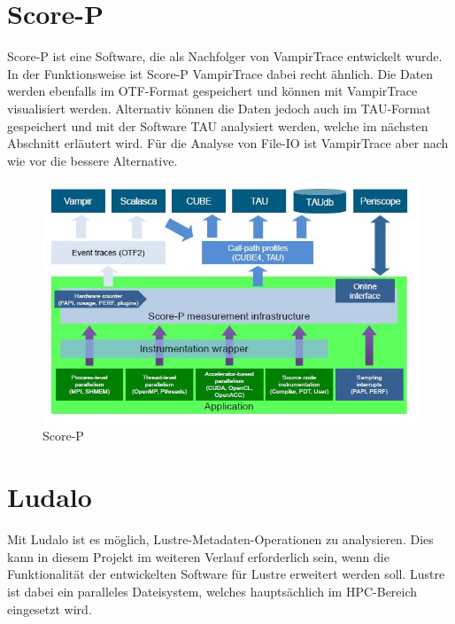\section{Score-P}
Score-P ist eine Software, die als Nachfolger von VampirTrace entwickelt wurde. In der Funktionsweise ist Score-P VampirTrace dabei recht \"ahnlich. Die Daten werden ebenfalls im OTF-Format gespeichert und k\"onnen mit VampirTrace visualisiert werden. Alternativ k\"onnen die Daten jedoch auch im TAU-Format gespeichert und mit der Software TAU analysiert werden, welche im n\"achsten Abschnitt erl\"autert wird. F\"ur die Analyse von File-IO ist VampirTrace aber nach wie vor die bessere Alternative.\cite{Kunke.2014}\cite{VirtualInstituteHighProductivitySupercomputing.2018}
\begin{figure}[h]
	\centering
	\includegraphics[width=12cm]{fig/Score-P.jpg}
	\caption{Score-P \cite{VirtualInstituteHighProductivitySupercomputing.2018}}
	\label{fig:score-p}
\end{figure}
\section{Ludalo}
Mit Ludalo ist es m\"oglich, Lustre-Metadaten-Operationen zu analysieren. Dies kann in diesem Projekt im weiteren Verlauf erforderlich sein, wenn die Funktionalit\"at der entwickelten Software f\"ur Lustre erweitert werden soll. Lustre ist dabei ein paralleles Dateisystem, welches haupts\"achlich im HPC-Bereich eingesetzt wird.
\cite{Berger.30.07.2014}
